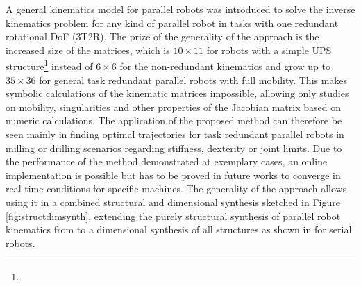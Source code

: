\documentclass[robotics,article,accept,moreauthors,pdftex]{Definitions/mdpi}
\begin{document}
A general kinematics model for parallel robots was introduced to solve the inverse kinematics problem for any kind of parallel robot in tasks with one redundant rotational DoF (3T2R).
The prize of the generality of the approach is the increased size of the  matrices, which is $10 \times 11$ for robots with a simple UPS structure\footnote{} instead of $6\times6$ for the non-redundant kinematics and grow up to $35 \times 36$ for general task redundant parallel robots with full mobility.
This makes symbolic calculations of the kinematic matrices impossible, allowing only studies on mobility, singularities and other properties of the Jacobian matrix based on numeric calculations.
The application of the proposed method can therefore be seen mainly in finding optimal trajectories for task redundant parallel robots in milling or drilling scenarios regarding stiffness, dexterity or joint limits.
%
Due to the performance of the method demonstrated at exemplary cases, an online implementation is possible but has to be proved in future works to converge in real-time conditions for specific machines.
The generality of the approach allows using it in a combined structural and dimensional synthesis sketched in Figure\,\ref{fig:structdimsynth}, extending the purely structural synthesis of parallel robot kinematics from \cite{Gogu2008,KongGos2005} to a dimensional synthesis of all structures as shown in \cite{RamirezKotOrt2015} for serial robots.
\end{document}
